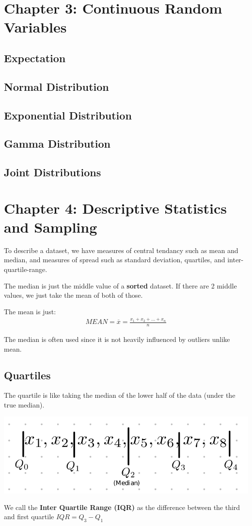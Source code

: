 \documentclass[12pt,letterpaper]{article} \usepackage{amsmath} \usepackage{graphicx} \usepackage[margin=1in]{geometry} \usepackage{longtable}  \usepackage{amssymb}
\begin{document}
	\section{Chapter 3: Continuous Random Variables}
	
	\subsection{Expectation}
	
	\subsection{Normal Distribution}
	
	\subsection{Exponential Distribution}
	
	\subsection{Gamma Distribution}
	
	\subsection{Joint Distributions}
	
	\section{Chapter 4: Descriptive Statistics and Sampling}
	To describe a dataset, we have measures of central tendancy such as mean and median, and measures of spread such as standard deviation, quartiles, and inter-quartile-range. 
	
	The median is just the middle value of a \textbf{sorted} dataset. If there are 2 middle values, we just take the mean of both of those. 
	
	The mean is just:
	\begin{align*}
		MEAN = \overline{x} = \frac{x_1 + x_2 + ... + x_n}{n}
	\end{align*}

	The median is often used since it is not heavily influenced by outliers unlike mean. 
	
	\subsection{Quartiles}
	The quartile is like taking the median of the lower half of the data (under the true median). 
	\begin{center}
		\includegraphics[width=0.4\linewidth]{quartiles}
	\end{center}
	We call the \textbf{Inter Quartile Range (IQR)} as the difference between the third and first quartile $IQR = Q_3-Q_1$
\end{document}
